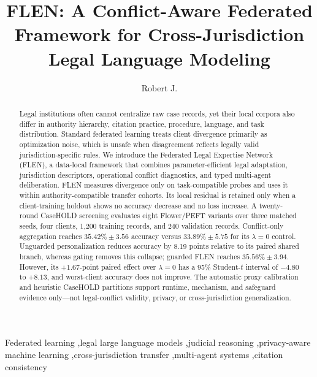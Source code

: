 \documentclass[preprint,12pt,authoryear]{elsarticle}
\begin{document}
\begin{frontmatter}

\title{FLEN: A Conflict-Aware Federated Framework for Cross-Jurisdiction Legal Language Modeling}

\author[inst1]{Robert J.}
\address[inst1]{Independent Research Project}

\begin{abstract}
Legal institutions often cannot centralize raw case records, yet their local corpora also differ in authority hierarchy, citation practice, procedure, language, and task distribution. Standard federated learning treats client divergence primarily as optimization noise, which is unsafe when disagreement reflects legally valid jurisdiction-specific rules. We introduce the Federated Legal Expertise Network (FLEN), a data-local framework that combines parameter-efficient legal adaptation, jurisdiction descriptors, operational conflict diagnostics, and typed multi-agent deliberation. FLEN measures divergence only on task-compatible probes and uses it within authority-compatible transfer cohorts. Its local residual is retained only when a client-training holdout shows no accuracy decrease and no loss increase. A twenty-round CaseHOLD screening evaluates eight Flower/PEFT variants over three matched seeds, four clients, 1,200 training records, and 240 validation records. Conflict-only aggregation reaches $35.42\%\pm3.56$ accuracy versus $33.89\%\pm5.75$ for its $\lambda=0$ control. Unguarded personalization reduces accuracy by 8.19 points relative to its paired shared branch, whereas gating removes this collapse; guarded FLEN reaches $35.56\%\pm3.94$. However, its $+1.67$-point paired effect over $\lambda=0$ has a 95\% Student-$t$ interval of $-4.80$ to $+8.13$, and worst-client accuracy does not improve. The automatic proxy calibration and heuristic CaseHOLD partitions support runtime, mechanism, and safeguard evidence only---not legal-conflict validity, privacy, or cross-jurisdiction generalization.
\end{abstract}

\begin{keyword}
Federated learning \sep legal large language models \sep judicial reasoning \sep privacy-aware machine learning \sep cross-jurisdiction transfer \sep multi-agent systems \sep citation consistency
\end{keyword}

\end{frontmatter}

\end{document}

